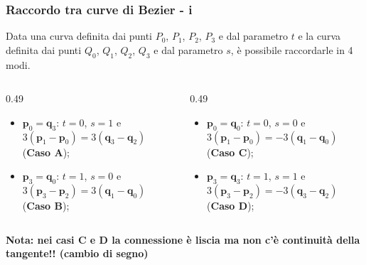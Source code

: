 \documentclass{beamer}
\begin{document}
\begin{frame}
\frametitle{Raccordo tra curve di Bezier - i}
Data una curva definita dai punti $P_0$, $P_1$, $P_2$, $P_3$ e dal parametro $t$ e la curva definita dai punti $Q_0$, $Q_1$, $Q_2$, $Q_3$ e dal parametro $s$, \`e possibile raccordarle in 4 modi.
\begin{columns}
\begin{column} {0.49\textwidth}

\begin{itemize}
\item $\mathbf{p}_0= \mathbf{q}_3$: $t=0$, $s = 1$ 
e $3(\mathbf{p}_1-\mathbf{p}_0) = 3(\mathbf{q}_3-\mathbf{q}_2)$ (\textbf{Caso A});
\item  $\mathbf{p}_3 = \mathbf{q}_0$: $t=1$, $s = 0$ e $3(\mathbf{p}_3-\mathbf{p}_2) = 3(\mathbf{q}_1-\mathbf{q}_0)$ (\textbf{Caso B});
\end{itemize}
\end{column}
\begin{column} {0.49\textwidth}
\begin{itemize}
\item $\mathbf{p}_0= \mathbf{q}_0$: $t=0$, $s =0$ e $3(\mathbf{p}_1-\mathbf{p}_0) = -3(\mathbf{q}_1-\mathbf{q}_0)$ (\textbf{Caso C});
\item  $\mathbf{p}_3 = \mathbf{q}_3$: $t=1$, $s = 1$ e $3(\mathbf{p}_3-\mathbf{p}_2) = -3(\mathbf{q}_3-\mathbf{q}_2)$ (\textbf{Caso D});
\end{itemize}
\end{column}
\end{columns}
\vspace{1cm}
\textbf{Nota: nei casi C e D la connessione \`e liscia ma non c'\`e continuit\`a della tangente!! (cambio di segno)}
\end{frame}
%
\end{document}
